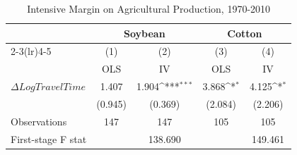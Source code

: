 \begin{table}[htbp]\centering
\def\sym#1{\ifmmode^{#1}\else\(^{#1}\)\fi}
\caption{Intensive Margin on Agricultural Production, 1970-2010}
\begin{tabular}{l*{4}{c}}
\hline\hline
                    &\multicolumn{2}{c}{Soybean}                &\multicolumn{2}{c}{Cotton}                 \\\cmidrule(lr){2-3}\cmidrule(lr){4-5}
                    &\multicolumn{1}{c}{(1)}         &\multicolumn{1}{c}{(2)}         &\multicolumn{1}{c}{(3)}         &\multicolumn{1}{c}{(4)}         \\
                    &         OLS         &          IV         &         OLS         &          IV         \\
\hline
$\Delta Log Travel Time$&       1.407         &       1.904\sym{***}&       3.868\sym{*}  &       4.125\sym{*}  \\
                    &     (0.945)         &     (0.369)         &     (2.084)         &     (2.206)         \\
\hline
Observations        &         147         &         147         &         105         &         105         \\
First-stage F stat  &                     &     138.690         &                     &     149.461         \\
\hline\hline
\end{tabular}
\end{table}
